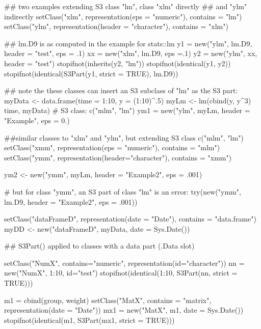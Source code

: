%
\begin{Examples}
\begin{ExampleCode}
## two examples extending S3 class "lm", class "xlm" directly
## and "ylm" indirectly
setClass("xlm", representation(eps = "numeric"), contains = "lm")
setClass("ylm", representation(header = "character"), contains = "xlm")

## lm.D9 is as computed in the example for stats::lm
y1 = new("ylm", lm.D9, header = "test", eps = .1)
xx = new("xlm", lm.D9, eps =.1)
y2 = new("ylm", xx, header = "test")
stopifnot(inherits(y2, "lm"))
stopifnot(identical(y1, y2))
stopifnot(identical(S3Part(y1, strict = TRUE), lm.D9))

## note the these classes can insert an S3 subclass of "lm" as the S3 part:
myData <- data.frame(time = 1:10, y = (1:10)^.5)
myLm <- lm(cbind(y, y^3)  ~ time, myData) # S3 class: c("mlm", "lm")
ym1 = new("ylm", myLm, header = "Example", eps = 0.)

##similar classes to "xlm" and "ylm", but extending S3 class c("mlm", "lm")
setClass("xmm", representation(eps = "numeric"), contains = "mlm")
setClass("ymm", representation(header="character"), contains = "xmm")

ym2 <- new("ymm", myLm, header = "Example2", eps = .001)

# but for class "ymm", an S3 part of class "lm" is an error:
try(new("ymm", lm.D9, header = "Example2", eps = .001))

setClass("dataFrameD", representation(date = "Date"),
         contains = "data.frame")
myDD <- new("dataFrameD", myData, date = Sys.Date())

## S3Part() applied to classes with a data part (.Data slot)

setClass("NumX", contains="numeric", representation(id="character"))
nn = new("NumX", 1:10, id="test")
stopifnot(identical(1:10, S3Part(nn, strict = TRUE)))
          
m1 = cbind(group, weight)
setClass("MatX", contains = "matrix", representation(date = "Date"))
mx1 = new("MatX", m1, date = Sys.Date())
stopifnot(identical(m1, S3Part(mx1, strict = TRUE)))


\end{ExampleCode}
\end{Examples}

